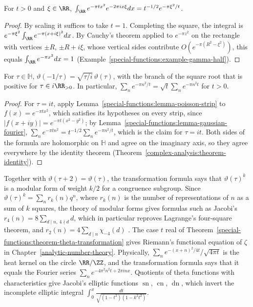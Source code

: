 \begin{lemma}\label{special-functions:lemma-gaussian-fourier}
For $t > 0$ and $\xi \in \RR$, $\int_\RR e^{-\pi tx^2}e^{-2\pi ix\xi}dx = t^{-1/2}e^{-\pi\xi^2/t}$.
\end{lemma}

\begin{proof}
By scaling it suffices to take $t = 1$. Completing the square, the integral is $e^{-\pi\xi^2}\int_\RR e^{-\pi(x + i\xi)^2}dx$. By Cauchy's theorem applied to $e^{-\pi z^2}$ on the rectangle with vertices $\pm R$, $\pm R + i\xi$, whose
vertical sides contribute $O(e^{-\pi(R^2 - \xi^2)})$, this equals $\int_\RR e^{-\pi x^2}dx = 1$ (Example~\ref{special-functions:example-gamma-half}).
\end{proof}

\begin{theorem}\label{special-functions:theorem-theta-transformation}
For $\tau \in \mathbb{H}$, $\vartheta(-1/\tau) = \sqrt{\tau/i}\,\vartheta(\tau)$, with the branch of the square root that is positive for $\tau \in i\RR_{>0}$. In particular, $\sum_ne^{-\pi n^2/t} = \sqrt{t}\sum_ne^{-\pi n^2t}$ for $t > 0$.
\end{theorem}

\begin{proof}
For $\tau = it$, apply Lemma~\ref{special-functions:lemma-poisson-strip} to $f(x) = e^{-\pi tx^2}$, which satisfies its hypotheses on every strip, since $|f(x + iy)| = e^{-\pi t(x^2 - y^2)}$; by Lemma~\ref{special-functions:lemma-gaussian-fourier},
$\sum_ne^{-\pi tn^2} = t^{-1/2}\sum_ne^{-\pi n^2/t}$, which is the claim for $\tau = it$. Both sides of the formula are holomorphic on $\mathbb{H}$ and agree on the imaginary axis, so they agree everywhere by the identity theorem
(Theorem~\ref{complex-analysis:theorem-identity}).
\end{proof}

\begin{remark}\label{special-functions:remark-theta-applications}
Together with $\vartheta(\tau + 2) = \vartheta(\tau)$, the transformation formula says that $\vartheta(\tau)^k$ is a modular form of weight $k/2$ for a congruence subgroup. Since $\vartheta(\tau)^k = \sum_nr_k(n)q^n$, where $r_k(n)$ is
the number of representations of $n$ as a sum of $k$ squares, the theory of modular forms gives formulas such as Jacobi's $r_4(n) = 8\sum_{d \mid n,\ 4 \nmid d}d$, which in particular reproves Lagrange's four-square theorem, and
$r_2(n) = 4\sum_{d \mid n}\chi_{-4}(d)$ \cite{hardy-wright}. The case $t$ real of Theorem~\ref{special-functions:theorem-theta-transformation} gives Riemann's functional equation of $\zeta$ in Chapter~\ref{analytic-number-theory}.
Physically, $\sum_ne^{-(x + n)^2/4t}/\sqrt{4\pi t}$ is the heat kernel on the circle $\RR/\ZZ$, and the transformation formula says that it equals the Fourier series $\sum_ne^{-4\pi^2n^2t + 2\pi inx}$. Quotients of theta functions with
characteristics give Jacobi's elliptic functions $\operatorname{sn}$, $\operatorname{cn}$, $\operatorname{dn}$, which invert the incomplete elliptic integral $\int_0^x\frac{dt}{\sqrt{(1 - t^2)(1 - k^2t^2)}}$.
\end{remark}

